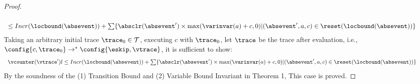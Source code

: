 \begin{proof}
\[\begin{array}{l}
\\
\leq 
Incr(\locbound(\absevent)) + 
\sum\{\absclr(\absevent') \times \max(\varinvar(a) + c, 0) | (\absevent', a, c) \in \reset(\locbound(\absevent))\} 
\end{array}
\]
  Taking an arbitrary initial trace
  $\trace_0 \in \mathcal{T}$, 
  executing $c$ with $\trace_0$, let $\trace$ be the trace after evaluation, i.e., $\config{{c}, \trace_0} \to^{*} \config{\eskip,\vtrace}$, it is sufficient to show:
  \[ 
    \begin{array}{l}
      \vcounter(\vtrace') l \leq 
    Incr(\locbound(\absevent)) + 
    \sum\{\absclr(\absevent') \times \max(\varinvar(a) + c, 0) | (\absevent', a, c) \in \reset(\locbound(\absevent))\}
  \end{array}
  \]
%
 By the soundness of the (1) Transition Bound and (2) Variable Bound Invariant 
 in \cite{sinn2017complexity} Theorem 1, 
This case is proved.
\end{proof}
